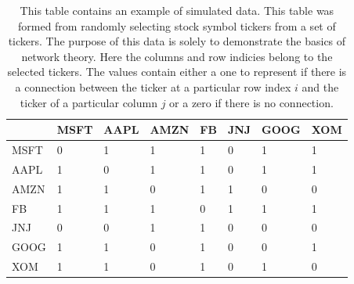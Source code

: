 \clearpage

\begin{table}[htbp]
\begin{center}
    \begin{tabular}{|p{2cm}|p{1.5cm}|p{1.5cm}|p{1.5cm}|p{1.5cm}|p{1.5cm}|p{1.5cm}|p{1.5cm}|  }
        \hline
         & MSFT & AAPL & AMZN & FB & JNJ &  GOOG & XOM\\
        \hline
        MSFT  & 0 & 1 & 1 & 1  & 0 & 1 & 1 \\
        \hline
        AAPL & 1& 0 & 1 & 1 & 0 & 1 & 1 \\
        \hline
        AMZN & 1 & 1 & 0 & 1 & 1  & 0 & 0 \\
        \hline
        FB & 1 & 1 & 1 & 0  & 1 & 1 & 1 \\
        \hline
        JNJ & 0 & 0 & 1 & 1 & 0 & 0 & 0  \\ 
        \hline
        GOOG & 1 & 1 & 0 & 1 & 0 & 0 & 1 \\
        \hline
        XOM & 1 & 1 & 0 & 1 & 0 & 1 & 0  \\
        \hline
    \end{tabular}
\end{center}
\caption{ 
      This table contains an example of simulated data. This table was formed from randomly selecting stock symbol tickers from a set of tickers. The purpose of this data is solely to demonstrate the basics of network theory. Here the columns and row indicies belong to the selected tickers. The values contain either a one to represent if there is a connection between the ticker at a particular row index \(i\)  and the ticker of a particular column \(j\) or a zero if there is no connection.
}

\label{tab:ExampleTable}
\end{table}


%
%


